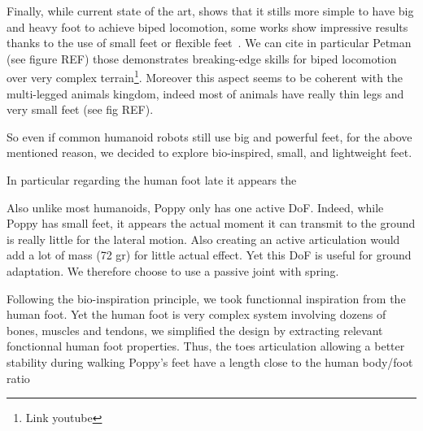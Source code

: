 Finally, while current state of the art, shows that it stills more simple to have big and heavy foot\parencite{REF} to achieve biped locomotion, some works show impressive results thanks to the use of small feet or flexible feet~\parencite{bruneau2001dynamic}. We can cite in particular Petman (see figure REF) those demonstrates breaking-edge skills for biped locomotion over very complex terrain\footnote{Link youtube}.
Moreover this aspect seems to be coherent with the multi-legged animals kingdom, indeed most of animals have really thin legs and very small feet (see fig REF).

So even if common humanoid robots still use big and powerful feet, for the above mentioned reason, we decided to explore bio-inspired, small, and lightweight feet.

In particular regarding the human foot late it appears the

Also unlike most humanoids, Poppy only has one active DoF. Indeed, while Poppy has small feet, it appears the actual moment it can transmit to the ground is really little for the lateral motion. Also creating an active articulation would add a lot of mass (72 gr) for little actual effect. Yet this DoF is useful for ground adaptation. We therefore choose to use a passive joint with spring.

Following the bio-inspiration principle, we took functionnal inspiration from the human foot. Yet the human foot is very complex system involving dozens of bones, muscles and tendons, we simplified the design by extracting relevant fonctionnal human foot properties. Thus, the toes articulation allowing a better stability during walking
Poppy's feet have a length close to the human body/foot ratio



